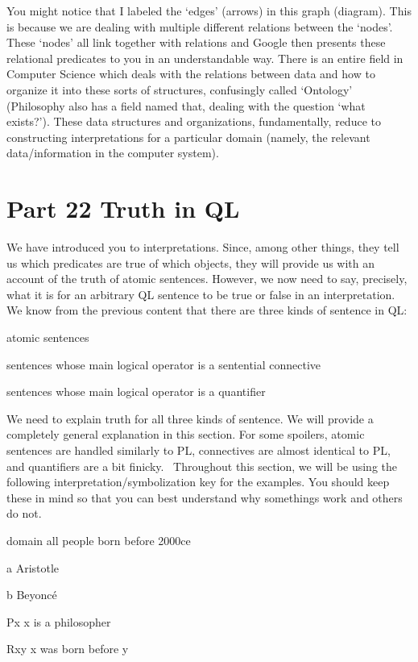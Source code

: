 You might notice that I labeled the `edges' (arrows) in this graph (diagram). This is because we are dealing with multiple different relations between the `nodes'. These `nodes' all link together with relations and Google then presents these relational predicates to you in an understandable way. There is an entire field in Computer Science which deals with the relations between data and how to organize it into these sorts of structures, confusingly called `Ontology' (Philosophy also has a field named that, dealing with the question `what exists?'). These data structures and organizations, fundamentally, reduce to constructing interpretations for a particular domain (namely, the relevant data/information in the computer system).   

\chapter{Part 22 Truth in QL}
We have introduced you to interpretations. Since, among other things, they tell us which predicates are true of which objects, they will provide us with an account of the truth of atomic sentences. However, we now need to say, precisely, what it is for an arbitrary QL sentence to be true or false in an interpretation. We know from the previous content that there are three kinds of sentence in QL:
\begin{ebullet}
\item[\textbullet]atomic sentences
\item[\textbullet]sentences whose main logical operator is a sentential connective 
\item[\textbullet]sentences whose main logical operator is a quantifier
\end{ebullet}
We need to explain truth for all three kinds of sentence. We will provide a completely general explanation in this section. For some spoilers, atomic sentences are handled similarly to PL, connectives are almost identical to PL, and quantifiers are a bit finicky.  Throughout this section, we will be using the following interpretation/symbolization key for the examples. You should keep these in mind so that you can best understand why somethings work and others do not. 
\begin{ekey}
\item[domain] all people born before 2000ce
\item[a] Aristotle
\item[b] Beyoncé
\item[Px] x is a philosopher
\item[Rxy] x was born before y
\end{ekey}

